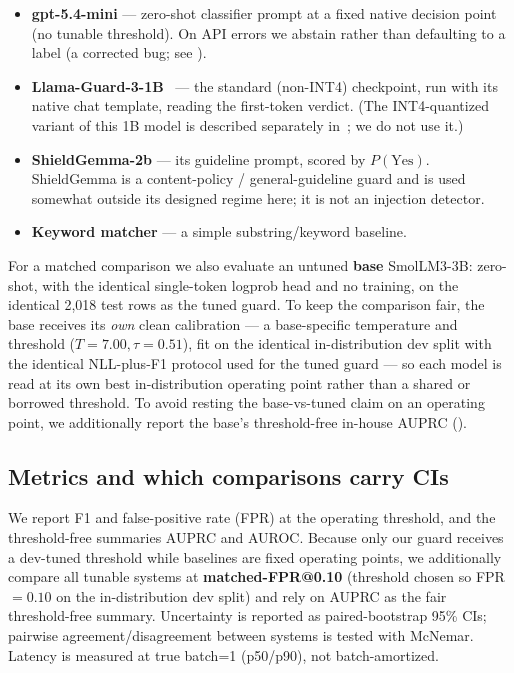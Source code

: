 \documentclass[sigconf,nonacm]{acmart}
\begin{document}
\begin{itemize}
  \item \textbf{gpt-5.4-mini} --- zero-shot classifier prompt at a fixed native decision point (no tunable threshold). On API errors we abstain rather than defaulting to a label (a corrected bug; see ).
  \item \textbf{Llama-Guard-3-1B}~\cite{meta2024llamaguard2_3} --- the standard (non-INT4) checkpoint, run with its native chat template, reading the first-token verdict. (The INT4-quantized variant of this 1B model is described separately in~\cite{fedorov2024llamaguard3_1b}; we do not use it.)
  \item \textbf{ShieldGemma-2b} --- its guideline prompt, scored by $P(\text{Yes})$. ShieldGemma is a content-policy / general-guideline guard and is used somewhat outside its designed regime here; it is not an injection detector.
  \item \textbf{Keyword matcher} --- a simple substring/keyword baseline.
\end{itemize}

For a matched comparison we also evaluate an untuned \textbf{base} SmolLM3-3B: zero-shot, with the identical single-token logprob head and no training, on the identical 2,018 test rows as the tuned guard. To keep the comparison fair, the base receives its \emph{own} clean calibration --- a base-specific temperature and threshold ($T{=}7.00,\tau{=}0.51$), fit on the identical in-distribution dev split with the identical NLL-plus-F1 protocol used for the tuned guard --- so each model is read at its own best in-distribution operating point rather than a shared or borrowed threshold. To avoid resting the base-vs-tuned claim on an operating point, we additionally report the base's threshold-free in-house AUPRC ().

\subsection{Metrics and which comparisons carry CIs}
\label{sec:metrics}

We report F1 and false-positive rate (FPR) at the operating threshold, and the threshold-free summaries AUPRC and AUROC. Because only our guard receives a dev-tuned threshold while baselines are fixed operating points, we additionally compare all tunable systems at \textbf{matched-FPR@0.10} (threshold chosen so FPR $=0.10$ on the in-distribution dev split) and rely on AUPRC as the fair threshold-free summary. Uncertainty is reported as paired-bootstrap 95\% CIs; pairwise agreement/disagreement between systems is tested with McNemar. Latency is measured at true batch=1 (p50/p90), not batch-amortized.
\end{document}
